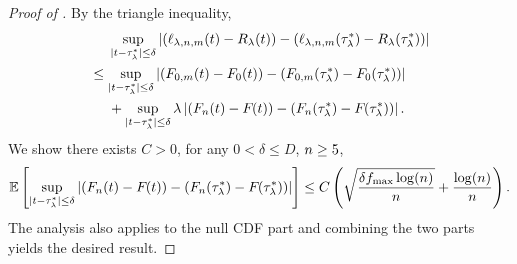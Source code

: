 \begin{proof}[Proof of ]
By the triangle inequality,
\begin{align*}
    &\quad~\sup_{|{t} - {\tau^*_\lambda}| \le \delta}\left|
    \left({{\ell}_{\lambda, {n}, m}}({t}) - {R_{\lambda}}{}({t})\right) -
    \left({{\ell}_{\lambda, {n}, m}}({\tau^*_\lambda}) - {R_{\lambda}}{}({\tau^*_\lambda})\right)
    \right|\\
    &\le \sup_{|{t} - {\tau^*_\lambda}| \le \delta}\left|
    \left({{F}_{0,m}}({t}) - {F_{0}}({t})\right) -
    \left({{F}_{0,m}}({\tau^*_\lambda}) - {F_{0}}({\tau^*_\lambda})\right)
    \right| \\
    &\quad~+ \sup_{|{t} - {\tau^*_\lambda}| \le \delta}\lambda\left|
    \left({{F}_n}{}({t}) - {F_{}}({t})\right) -
    \left({{F}_n}({\tau^*_\lambda}) - {F_{}}{}({\tau^*_\lambda})\right)
    \right|.
\end{align*}
We show there exists $C > 0$, for any $0 < \delta \le D$, ${n} \ge 5$,
\begin{align}\label{proof:lemm:eq:M.estimator}
    \mathbb{E}\left[\sup_{|{t} - {\tau^*_\lambda}| \le \delta} \left|
        \left({{F}_n}({t}) - {F_{}}({t})\right) -
        \left({{F}_n}({\tau^*_\lambda}) - {F_{}}({\tau^*_\lambda})\right)
        \right|\right] \le C \left(\sqrt{\frac{\delta {f_{\max}} \log({n})}{{n}}} + \frac{\log({n})}{{n}}\right).
\end{align}
The analysis also applies to the null CDF part and combining the two parts yields the desired result.


\end{proof}
